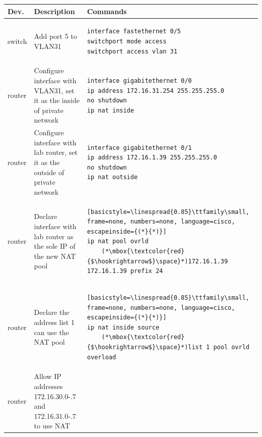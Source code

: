 \documentclass[a4paper, 11pt]{report}
\begin{document}
\begin{center}
    \small
    \begin{tabular}{@{}l | m{67mm} | l@{}}
        {\normalfont\textbf{Dev.}} & {\normalfont\textbf{Description}} & {\normalfont\textbf{Commands}} \\ \hline
        switch & Add port 5 to VLAN31 & \begin{lstlisting}[basicstyle=\linespread{0.85}\ttfamily\small, frame=none, numbers=none, language=cisco]
interface fastethernet 0/5
switchport mode access
switchport access vlan 31
        \end{lstlisting} \\ \hline
        router & Configure interface with VLAN31, set it as the inside of private network & \begin{lstlisting}[basicstyle=\linespread{0.85}\ttfamily\small, frame=none, numbers=none, language=cisco]
interface gigabitethernet 0/0
ip address 172.16.31.254 255.255.255.0
no shutdown
ip nat inside
        \end{lstlisting} \\
        router & Configure interface with lab router, set it as the outside of private network & \begin{lstlisting}[basicstyle=\linespread{0.85}\ttfamily\small, frame=none, numbers=none, language=cisco]
interface gigabitethernet 0/1
ip address 172.16.1.39 255.255.255.0
no shutdown
ip nat outside
        \end{lstlisting} \\
        router & Declare interface with lab router as the sole IP of the new NAT pool & \begin{lstlisting}[basicstyle=\linespread{0.85}\ttfamily\small, frame=none, numbers=none, language=cisco, escapeinside={(*}{*)}]
ip nat pool ovrld
    (*\mbox{\textcolor{red}{$\hookrightarrow$}\space}*)172.16.1.39 172.16.1.39 prefix 24
        \end{lstlisting} \\
        router & Declare the address list 1 can use the NAT pool & \begin{lstlisting}[basicstyle=\linespread{0.85}\ttfamily\small, frame=none, numbers=none, language=cisco, escapeinside={(*}{*)}]
ip nat inside source
    (*\mbox{\textcolor{red}{$\hookrightarrow$}\space}*)list 1 pool ovrld overload
        \end{lstlisting}\\
        router & Allow IP addresses 172.16.30.0-.7 and 172.16.31.0-.7 to use NAT & \begin{lstlisting}[basicstyle=\linespread{0.85}\ttfamily\small, frame=none, numbers=none, language=cisco]

\end{lstlisting}
\end{tabular}
\end{center}
\end{document}
